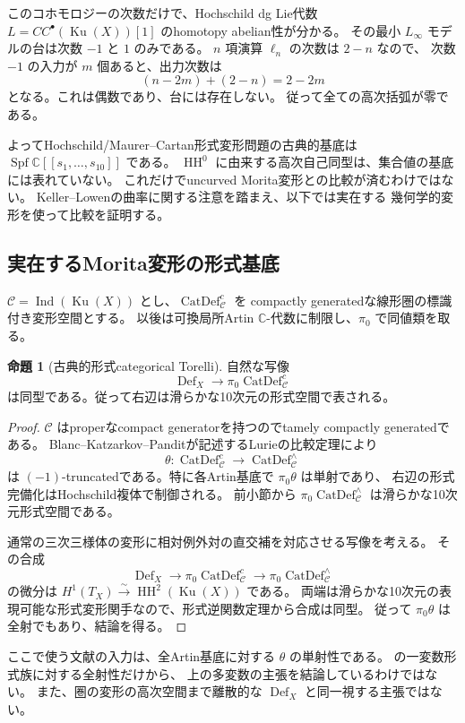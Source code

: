 \documentclass[a4paper,11pt]{ltjsarticle}
\theoremstyle{definition}
\newtheorem{theorem}{命題}[section]
\newcommand{\CC}{\mathbb C}
\newcommand{\Ku}{\operatorname{Ku}}
\newcommand{\HH}{\operatorname{HH}}
\newcommand{\Spf}{\operatorname{Spf}}
\newcommand{\Def}{\operatorname{Def}}
\newcommand{\CatDef}{\operatorname{CatDef}}
\newcommand{\Ind}{\operatorname{Ind}}
\begin{document}
このコホモロジーの次数だけで、Hochschild dg Lie代数
$L=CC^\bullet(\Ku(X))[1]$ のhomotopy abelian性が分かる。
その最小 $L_\infty$ モデルの台は次数 $-1$ と $1$ のみである。
$n$ 項演算 $\ell_n$ の次数は $2-n$ なので、
次数 $-1$ の入力が $m$ 個あると、出力次数は
\[
 (n-2m)+(2-n)=2-2m
\]
となる。これは偶数であり、台には存在しない。
従って全ての高次括弧が零である。

よってHochschild/Maurer--Cartan形式変形問題の古典的基底は
$\Spf\CC[[s_1,\ldots,s_{10}]]$ である。
$\HH^0$ に由来する高次自己同型は、集合値の基底には表れていない。
これだけでuncurved Morita変形との比較が済むわけではない。
Keller--Lowen\cite{KL}の曲率に関する注意を踏まえ、以下では実在する
幾何学的変形を使って比較を証明する。

\subsection{実在するMorita変形の形式基底}

$\mathcal C=\Ind(\Ku(X))$ とし、$\CatDef^c_{\mathcal C}$ を
compactly generatedな線形圏の標識付き変形空間とする。
以後は可換局所Artin $\CC$-代数に制限し、$\pi_0$ で同値類を取る。

\begin{theorem}[古典的形式categorical Torelli]\label{thm:formal-torelli}
自然な写像
\[
 \Def_X\longrightarrow\pi_0\CatDef^c_{\mathcal C}
\]
は同型である。従って右辺は滑らかな10次元の形式空間で表される。
\end{theorem}

\begin{proof}
$\mathcal C$ はproperなcompact generatorを持つのでtamely compactly generatedである。
Blanc--Katzarkov--Pandit\cite[Section 3.3]{BKP}が記述するLurieの比較定理により
\[
 \theta:\CatDef^c_{\mathcal C}\longrightarrow\CatDef^\wedge_{\mathcal C}
\]
は $(-1)$-truncatedである。特に各Artin基底で $\pi_0\theta$ は単射であり、
右辺の形式完備化はHochschild複体で制御される。
前小節から $\pi_0\CatDef^\wedge_{\mathcal C}$ は滑らかな10次元形式空間である。

通常の三次三様体の変形に相対例外対の直交補を対応させる写像を考える。
その合成
\[
 \Def_X\longrightarrow\pi_0\CatDef^c_{\mathcal C}
 \longrightarrow\pi_0\CatDef^\wedge_{\mathcal C}
\]
の微分は $H^1(T_X)\xrightarrow{\sim}\HH^2(\Ku(X))$ である。
両端は滑らかな10次元の表現可能な形式変形関手なので、形式逆関数定理から合成は同型。
従って $\pi_0\theta$ は全射でもあり、結論を得る。
\end{proof}

ここで使う文献の入力は、全Artin基底に対する $\theta$ の単射性である。
\cite[Theorem 4.27]{BKP}の一変数形式族に対する全射性だけから、
上の多変数の主張を結論しているわけではない。
また、圏の変形の高次空間まで離散的な $\Def_X$ と同一視する主張ではない。
\end{document}
